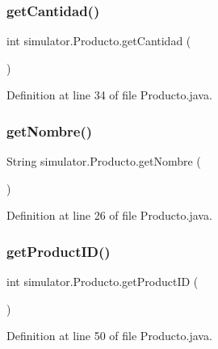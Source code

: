 \subsubsection{\texorpdfstring{get\+Cantidad()}{getCantidad()}}
{\footnotesize\ttfamily int simulator.\+Producto.\+get\+Cantidad (\begin{DoxyParamCaption}{ }\end{DoxyParamCaption})}



Definition at line 34 of file Producto.\+java.

\mbox{\label{classsimulator_1_1_producto_a1399ce876e1f4cd24c7f1f60da446c1f}} 
\subsubsection{\texorpdfstring{get\+Nombre()}{getNombre()}}
{\footnotesize\ttfamily String simulator.\+Producto.\+get\+Nombre (\begin{DoxyParamCaption}{ }\end{DoxyParamCaption})}



Definition at line 26 of file Producto.\+java.

\mbox{\label{classsimulator_1_1_producto_a28b4edc0f966aa82fc53af57a294e808}} 
\subsubsection{\texorpdfstring{get\+Product\+I\+D()}{getProductID()}}
{\footnotesize\ttfamily int simulator.\+Producto.\+get\+Product\+ID (\begin{DoxyParamCaption}{ }\end{DoxyParamCaption})}



Definition at line 50 of file Producto.\+java.

\mbox{\label{classsimulator_1_1_producto_a4c2960024b49a7e4d28752ffde30e3c7}} 

